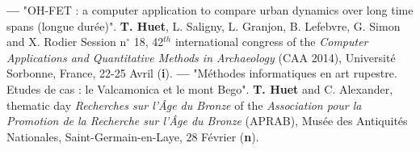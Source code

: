 \documentclass{article}
\begin{document}
\smallbreak
\textbf{--- }"OH-FET : a computer application to compare urban dynamics over long time spans (longue dur\'{e}e)". \textbf{T. Huet}, L. Saligny, L. Granjon, B. Lefebvre, G. Simon and X. Rodier Session n$\mathrm{{}^\circ}$ 18, 42${}^{th}$ international congress of the \textit{Computer Applications and Quantitative Methods in Archaeology} (CAA 2014), Universit\'{e} Sorbonne, France, 22-25 Avril (\textbf{i}).
\smallbreak
\textbf{--- }"M\'{e}thodes informatiques en art rupestre. Etudes de cas : le Valcamonica et le mont Bego". \textbf{T. Huet} and C. Alexander, thematic day \textit{Recherches sur l'\^{A}ge du Bronze }of the\textit{ Association pour la Promotion de la Recherche sur l'\^{A}ge du Bronze }(APRAB), Mus\'{e}e des Antiquit\'{e}s Nationales, Saint-Germain-en-Laye, 28 Février (\textbf{n}).
\end{document}
